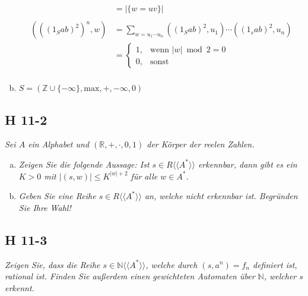 \documentclass{scrartcl}
\begin{document}
\begin{enumerate}[(a)]
\begin{align*}
          &= |\{w = uv\}|\\
        \\
        (((1_S ab)^2)^n, w) &= \sum_{w = u_1 \cdots u_n} ((1_S ab)^2, u_1) \cdots ((1_s ab)^2, u_n)\\
          &= \begin{cases}
            1, &\text{wenn } |w| \bmod 2 = 0\\
            0, &\text{sonst}
          \end{cases}
          \\
      \end{align*}

    \item $S = (\mathbb{Z} \cup \{-\infty\}, \text{max}, +, -\infty, 0)$
\end{enumerate}

\subsection{H 11-2}

\textsl{Sei $A$ ein Alphabet und $(\mathbb{R}, +, \cdot, 0, 1)$ der Körper der reelen Zahlen.}

\begin{enumerate}[(a)]
    \item \textsl{Zeigen Sie die folgende Aussage: Ist $s \in R\langle\langle A^* \rangle\rangle$ erkennbar, dann gibt es ein $K > 0$ mit $|(s, w)| \leq K^{|w|+2}$ für alle $w \in A^*$.}
    \item \textsl{Geben Sie eine Reihe $s \in R\langle\langle A^* \rangle\rangle$ an, welche nicht erkennbar ist. Begründen Sie Ihre Wahl!}
\end{enumerate}

\subsection{H 11-3}

\textsl{Zeigen Sie, dass die Reihe $s \in \mathbb{N}\langle\langle A^* \rangle\rangle$, welche durch $(s, a^n) = f_n$ definiert ist, rational ist. Finden Sie außerdem einen gewichteten Automaten über $\mathbb{N}$, welcher $s$ erkennt.}
\end{document}
